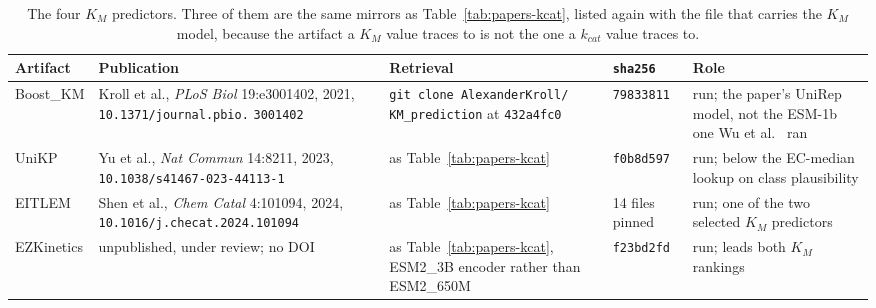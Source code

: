 \begin{table}[!htbp]
  \centering
  \footnotesize
  \caption[$K_M$ sources]{The four $K_M$ predictors. Three of them are the same mirrors as
  Table~\ref{tab:papers-kcat}, listed again with the file that carries the $K_M$ model,
  because the artifact a $K_M$ value traces to is not the one a $k_{cat}$ value traces to.}
  \label{tab:papers-km}
  \begin{tabular}{@{}p{}p{}p{}p{}p{}@{}}
    \hline
    Artifact & Publication & Retrieval & \texttt{sha256} & Role \\
    \hline
    Boost\_KM & Kroll et al., \emph{PLoS Biol} 19:e3001402, 2021,
      \texttt{10.1371/journal.pbio.} \texttt{3001402} &
      \texttt{git clone AlexanderKroll/} \texttt{KM\_prediction} at \texttt{432a4fc0} &
      \texttt{79833811} & run; the paper's UniRep model, not the ESM-1b one Wu et
      al.~\cite{wuSystematicallyExploringYeast2026} ran \\
    UniKP & Yu et al., \emph{Nat Commun} 14:8211, 2023,
      \texttt{10.1038/s41467-023-44113-1} & as Table~\ref{tab:papers-kcat} &
      \texttt{f0b8d597} & run; below the EC-median lookup on class plausibility \\
    EITLEM & Shen et al., \emph{Chem Catal} 4:101094, 2024,
      \texttt{10.1016/j.checat.2024.101094} & as Table~\ref{tab:papers-kcat} &
      14 files pinned & run; one of the two selected $K_M$ predictors \\
    EZKinetics & unpublished, under review; no DOI & as Table~\ref{tab:papers-kcat},
      ESM2\_3B encoder rather than ESM2\_650M & \texttt{f23bd2fd} &
      run; leads both $K_M$ rankings \\
    \hline
  \end{tabular}
\end{table}

